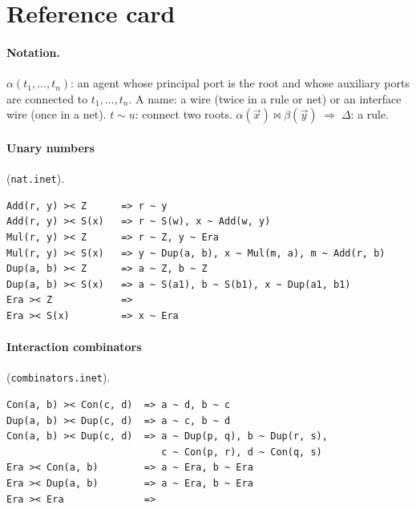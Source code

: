 \documentclass[11pt,a4paper]{article}
\newcommand{\act}{\mathrel{\bowtie}}
\newcommand{\eqn}{\mathrel{\sim}}
\newcommand{\rul}{\;\Rightarrow\;}
\theoremstyle{definition}
\theoremstyle{plain}
\begin{document}
\section{Reference card}\label{sec:card}

\paragraph{Notation.} $\alpha(t_1,\dots,t_n)$: an agent whose principal port
is the root and whose auxiliary ports are connected to $t_1,\dots,t_n$. A
name: a wire (twice in a rule or net) or an interface wire (once in a net).
$t \eqn u$: connect two roots. $\alpha(\vec x)\act\beta(\vec y) \rul \Delta$:
a rule.

\paragraph{Unary numbers} (\texttt{nat.inet}).
\begin{lstlisting}
Add(r, y) >< Z      => r ~ y
Add(r, y) >< S(x)   => r ~ S(w), x ~ Add(w, y)
Mul(r, y) >< Z      => r ~ Z, y ~ Era
Mul(r, y) >< S(x)   => y ~ Dup(a, b), x ~ Mul(m, a), m ~ Add(r, b)
Dup(a, b) >< Z      => a ~ Z, b ~ Z
Dup(a, b) >< S(x)   => a ~ S(a1), b ~ S(b1), x ~ Dup(a1, b1)
Era >< Z            =>
Era >< S(x)         => x ~ Era
\end{lstlisting}

\paragraph{Interaction combinators} (\texttt{combinators.inet}).
\begin{lstlisting}
Con(a, b) >< Con(c, d)  => a ~ d, b ~ c
Dup(a, b) >< Dup(c, d)  => a ~ c, b ~ d
Con(a, b) >< Dup(c, d)  => a ~ Dup(p, q), b ~ Dup(r, s),
                           c ~ Con(p, r), d ~ Con(q, s)
Era >< Con(a, b)        => a ~ Era, b ~ Era
Era >< Dup(a, b)        => a ~ Era, b ~ Era
Era >< Era              =>
\end{lstlisting}
\end{document}
